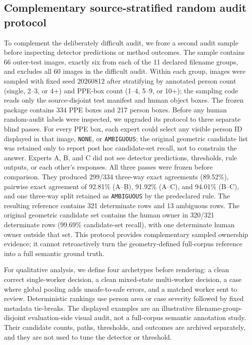 \documentclass[iicol,pdflatex,sn-mathphys-num]{sn-jnl}
\begin{document}
\subsection{Complementary source-stratified random audit protocol}
To complement the deliberately difficult audit, we froze a second audit sample before inspecting detector predictions or method outcomes. The sample contains 66 outer-test images, exactly six from each of the 11 declared filename groups, and excludes all 60 images in the difficult audit. Within each group, images were sampled with fixed seed 20260812 after stratifying by annotated person count (single, 2--3, or 4+) and PPE-box count (1--4, 5--9, or 10+); the sampling code reads only the source-disjoint test manifest and human object boxes. The frozen package contains 334 PPE boxes and 217 person boxes. Before any human random-audit labels were inspected, we upgraded its protocol to three separate blind passes. For every PPE box, each expert could select any visible person ID displayed in that image, \texttt{NONE}, or \texttt{AMBIGUOUS}; the original geometric candidate list was retained only to report post hoc candidate-set recall, not to constrain the answer. Experts A, B, and C did not see detector predictions, thresholds, rule outputs, or each other's responses. All three passes were frozen before comparison. They produced 299/334 three-way exact agreements (89.52\%), pairwise exact agreement of 92.81\% (A--B), 91.92\% (A--C), and 94.01\% (B--C), and one three-way split retained as \texttt{AMBIGUOUS} by the predeclared rule. The resulting reference contains 321 determinate rows and 13 ambiguous rows. The original geometric candidate set contains the human owner in 320/321 determinate rows (99.69\% candidate-set recall), with one determinate human owner outside that set. This protocol provides complementary sampled ownership evidence; it cannot retroactively turn the geometry-defined full-corpus reference into a full semantic ground truth.


For qualitative analysis, we define four archetypes before rendering: a clean correct single-worker decision, a clean mixed-state multi-worker decision, a case where global pooling adds unsafe-to-safe errors, and a matched worker sent to review. Deterministic rankings use person area or case severity followed by fixed metadata tie-breaks. The displayed examples are an illustrative filename-group-disjoint evaluation-side visual audit, not a full-corpus semantic annotation study. Their candidate counts, paths, thresholds, and outcomes are archived separately, and they are not used to tune the detector or threshold.
\end{document}
